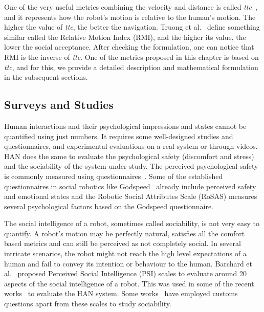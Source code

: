 One of the very useful metrics combining the velocity and distance is called \textit{\acrfull{ttc}}~\cite{biswas2022socnavbench}, and it represents how the robot's motion is relative to the human's motion. The higher the value of \textit{\acrshort{ttc}}, the better the navigation. Truong et al.~\cite{truong2017toward} define something similar called the Relative Motion Index (RMI), and the higher its value, the lower the social acceptance. After checking the formulation, one can notice that RMI is the inverse of \textit{\acrshort{ttc}}. One of the metrics proposed in this chapter is based on \textit{\acrshort{ttc}}, and for this, we provide a detailed description and mathematical formulation in the subsequent sections.

\subsection{Surveys and Studies}
Human interactions and their psychological impressions and states cannot be quantified using just numbers. It requires some well-designed studies and questionnaires, and experimental evaluations on a real system or through videos. HAN does the same to evaluate the psychological safety (discomfort and stress) and the sociability of the system under study. The perceived psychological safety is commonly measured using questionnaires~\cite{butler2001psychological}. Some of the established questionnaires in social robotics like Godspeed~\cite{bartneck2008measuring} already include perceived safety and emotional states and the Robotic Social Attributes Scale (RoSAS) measures several psychological factors based on the Godspeed questionnaire.

The social intelligence of a robot, sometimes called sociability, is not very easy to quantify. A robot's motion may be perfectly natural, satisfies all the comfort based metrics and can still be perceived as not completely social. In several intricate scenarios, the robot might not reach the high level expectations of a human and fail to convey its intention or behaviour to the human. Barchard et al.~\cite{barchardperceived} proposed Perceived Social Intelligence (PSI) scales to evaluate around 20 aspects of the social intelligence of a robot. This was used in some of the recent works~\cite{banisetty2021implicit, barchard2020measuring} to evaluate the HAN system. Some works~\cite{vega2018planning} have employed customs questions apart from these scales to study sociability.

